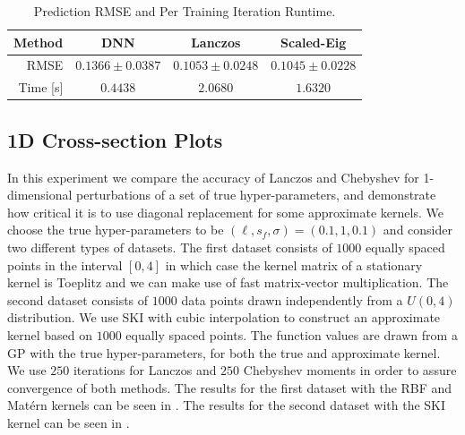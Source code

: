 \begin{table}[ht]
  \centering
  \caption{Prediction RMSE and Per Training Iteration Runtime.}\label{tab:dkl}
  \begin{tabular}{r c c c}
    \toprule
    Method & DNN & Lanczos & Scaled\hyp{}Eig \\
    \midrule
    RMSE & $0.1366\pm 0.0387$ & $0.1053\pm0.0248$ & $0.1045\pm 0.0228$\\
    Time [s]& $0.4438$ & $2.0680$ & $1.6320$\\
    \bottomrule
  \end{tabular} 
\end{table}

\subsection{1D Cross-section Plots}\label{sup:1dcross}

In this experiment we compare the accuracy of Lanczos and Chebyshev for
1\hyp{}dimensional perturbations of a set of true hyper\hyp{}parameters,
and demonstrate how critical it is to use diagonal replacement for some
approximate kernels. We choose the true hyper\hyp{}parameters to be $
(\ell,s_f,\sigma) = (0.1,1,0.1)$ and consider two different types of datasets.
The first dataset consists of $1000$ equally spaced points in the interval $
[0,4]$ in which case the kernel matrix of a stationary kernel is Toeplitz and we
can make use of fast matrix\hyp{}vector multiplication. The second dataset
consists of $1000$ data points drawn independently from a
$U(0,4)$ distribution. We use SKI with cubic interpolation to construct an
approximate kernel based on $1000$ equally spaced points. The function values
are drawn from a GP with the true hyper\hyp{}parameters, for both the true and
approximate kernel. We use $250$ iterations for Lanczos and $250$ Chebyshev
moments in order to assure convergence of both methods. The results for the
first dataset with the RBF and Mat\'ern kernels can be seen in 
. The results for the second
dataset with the SKI kernel can be seen in 
.

